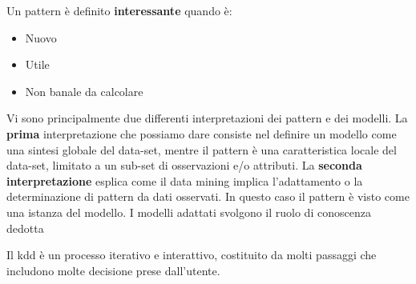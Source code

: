 \documentclass[a4paper]{extarticle}
\begin{document}
Un pattern è definito \textbf{interessante} quando è:
\begin{itemize}
	\item Nuovo
	\item Utile
	\item Non banale da calcolare
\end{itemize}

Vi sono principalmente due differenti interpretazioni dei pattern e dei modelli.
La \textbf{prima} interpretazione che possiamo dare consiste nel definire un modello come una sintesi globale del data-set, mentre il pattern è una caratteristica locale del data-set, limitato a un sub-set di osservazioni e/o attributi.
La \textbf{seconda interpretazione} esplica come il data mining implica l'adattamento o la determinazione di pattern da dati osservati. In questo caso il pattern è visto come una istanza del modello. I modelli adattati svolgono il ruolo di conoscenza dedotta

Il kdd è un processo iterativo e interattivo, costituito da molti passaggi che includono molte decisione prese dall'utente.

\begin{figure}[h]
\noindent
{}%
\end{figure}
\end{document}
